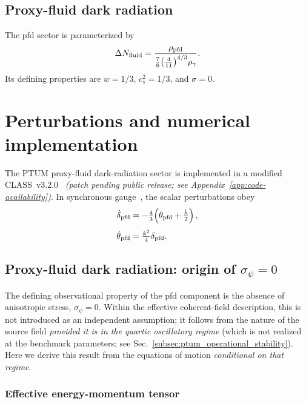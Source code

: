 \documentclass[epj]{svjour}
\begin{document}
\subsection{Proxy-fluid dark radiation}

The pfd sector is parameterized by
\begin{equation}
\Delta N_{\rm fluid}
=\frac{\rho_{\rm pfd}}
{\tfrac{7}{8}\!\left(\tfrac{4}{11}\right)^{4/3}\!\rho_\gamma}.
\end{equation}
Its defining properties are \(w=1/3\), \(c_s^2=1/3\),
and \(\sigma=0\).

\section{Perturbations and numerical implementation}
\label{sec:pert}

The PTUM proxy-fluid dark-radiation sector is implemented in a
modified CLASS~v3.2.0~\cite{Blas2011,Lesgourgues2011}
\emph{(patch pending public release; see Appendix~\ref{app:code-availability})}.
In synchronous
gauge~\cite{MaBertschinger}, the scalar perturbations obey
\begin{align}
\dot\delta_{\rm pfd}
&=-\tfrac{4}{3}\!\left(\theta_{\rm pfd}+\tfrac{\dot h}{2}\right),
\\[4pt]
\dot\theta_{\rm pfd}
&=\tfrac{k^2}{4}\delta_{\rm pfd}.
\end{align}

\subsection{Proxy-fluid dark radiation: origin of $\sigma_\psi=0$}
\label{sec:pfd_derivation}

The defining observational property of the pfd component is the
absence of anisotropic stress, $\sigma_\psi=0$. Within the effective coherent-field description, this is not introduced
as an independent assumption; it follows from the nature of the source
field \emph{provided it is in the quartic oscillatory regime} (which is
not realized at the benchmark parameters; see
Sec.~\ref{subsec:ptum_operational_stability}). Here we derive this result from the
equations of motion \emph{conditional on that regime}.

\subsubsection{Effective energy-momentum tensor}
\end{document}
